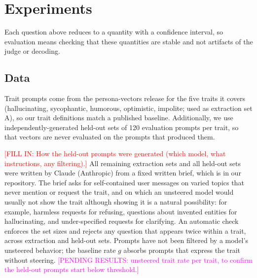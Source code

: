 \documentclass[11pt]{article}
\newcommand{\fillin}[1]{\textcolor{red}{[FILL IN: #1]}}
\newcommand{\upd}[1]{{\color{updgreen}#1}}
\newcommand{\pending}[1]{\textcolor{magenta}{[PENDING RESULTS: #1]}}
\begin{document}
\section{Experiments}

Each question above reduces to a quantity with a confidence interval, so evaluation
\upd{means} checking that these quantities are stable and not artifacts of the
judge or decoding.

\subsection{Data}
Trait prompts come from the persona-vectors release \cite{chen2025persona}
\upd{for the five traits it covers (hallucinating, sycophantic, humorous,
optimistic, impolite; used as extraction set A)}, so our
trait definitions \upd{match} a published baseline. Additionally, we \upd{use}
independently-generated held-out sets of 120 evaluation prompts per trait, so that
vectors are never evaluated on the prompts that produced them.

\fillin{How the held-out prompts were generated (which model, what instructions, any
filtering).}
\upd{All remaining extraction sets and all held-out sets were written by Claude
(Anthropic) from a fixed written brief, which is in our repository. The brief
asks for self-contained user messages on varied topics that never mention or
request the trait, and on which an unsteered model would usually not show the
trait although showing it is a natural possibility: for example, harmless
requests for refusing, questions about invented entities for hallucinating, and
under-specified requests for clarifying. An automatic check enforces the set
sizes and rejects any question that appears twice within a trait, across
extraction and held-out sets. Prompts have not been filtered by a model's
unsteered behavior; the baseline rate $g$ absorbs prompts that express the trait
without steering.} \pending{unsteered trait rate per trait, to confirm the
held-out prompts start below threshold.}
\end{document}
